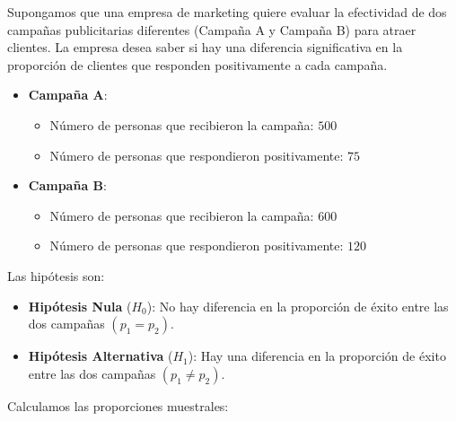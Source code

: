\documentclass[
  letterpaper,
  DIV=11,
  numbers=noendperiod]{scrreprt}
\providecommand{\tightlist}{%
  \setlength{\itemsep}{0pt}\setlength{\parskip}{0pt}}\usepackage{longtable,booktabs,array}
\begin{document}
\begin{tcolorbox}[enhanced jigsaw, arc=.35mm, breakable, coltitle=black, left=2mm, opacityback=0, bottomtitle=1mm, colbacktitle=quarto-callout-tip-color!10!white, title=\textcolor{quarto-callout-tip-color}{\faLightbulb}\hspace{0.5em}{Ejemplo Práctico. Contraste de hipótesis igualdad de proporciones}, titlerule=0mm, colback=white, colframe=quarto-callout-tip-color-frame, bottomrule=.15mm, rightrule=.15mm, opacitybacktitle=0.6, toptitle=1mm, toprule=.15mm, leftrule=.75mm]

Supongamos que una empresa de marketing quiere evaluar la efectividad de
dos campañas publicitarias diferentes (Campaña A y Campaña B) para
atraer clientes. La empresa desea saber si hay una diferencia
significativa en la proporción de clientes que responden positivamente a
cada campaña.

\begin{itemize}
\tightlist
\item
  \textbf{Campaña A}:

  \begin{itemize}
  \tightlist
  \item
    Número de personas que recibieron la campaña: \(500\)
  \item
    Número de personas que respondieron positivamente: \(75\)
  \end{itemize}
\item
  \textbf{Campaña B}:

  \begin{itemize}
  \tightlist
  \item
    Número de personas que recibieron la campaña: \(600\)
  \item
    Número de personas que respondieron positivamente: \(120\)
  \end{itemize}
\end{itemize}

Las hipótesis son:

\begin{itemize}
\tightlist
\item
  \textbf{Hipótesis Nula} (\(H_0\)): No hay diferencia en la proporción
  de éxito entre las dos campañas \((p_1 = p_2)\).
\item
  \textbf{Hipótesis Alternativa} (\(H_1\)): Hay una diferencia en la
  proporción de éxito entre las dos campañas \((p_1 \neq p_2)\).
\end{itemize}

Calculamos las proporciones muestrales:


\end{tcolorbox}
\end{document}
